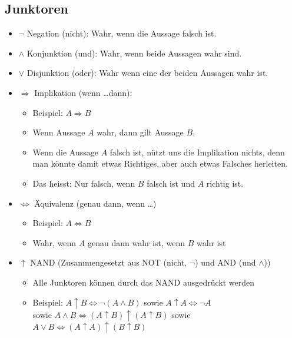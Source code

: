 \subsection{Junktoren}
\begin{itemize}
  \item $\neg$ Negation (nicht): Wahr, wenn die Aussage falsch ist.
  \item $\wedge$ Konjunktion (und): Wahr, wenn beide Aussagen wahr sind.
  \item $\vee$ Disjunktion (oder): Wahr wenn eine der beiden Aussagen wahr ist.
  \item $\Rightarrow$ Implikation (wenn \dots dann):
    \begin{itemize}
      \item Beispiel: $A \Rightarrow B$
      \item Wenn Aussage $A$ wahr, dann gilt Aussage $B$.
      \item Wenn die Aussage $A$ falsch ist, nützt uns die Implikation nichts,
        denn man könnte damit etwas Richtiges, aber auch etwas Falsches herleiten.
      \item Das heisst: Nur falsch, wenn $B$ falsch ist und $A$ richtig ist.
    \end{itemize}
  \item $\Leftrightarrow$ Äquivalenz (genau dann, wenn \dots)
    \begin{itemize}
      \item Beispiel: $A \Leftrightarrow B$
      \item Wahr, wenn $A$ genau dann wahr ist, wenn $B$ wahr ist
    \end{itemize}
  \item $\uparrow$ NAND (Zusammengesetzt aus NOT (nicht, $\neg$) und AND (und $\wedge$))
    \begin{itemize}
      \item Alle Junktoren können durch das NAND ausgedrückt werden
      \item Beispiel: $A \uparrow B \Leftrightarrow \neg (A \wedge B)$ sowie $A \uparrow A \Leftrightarrow \neg A$ \\
       sowie $A \wedge B \Leftrightarrow (A \uparrow B) \uparrow (A \uparrow B)$ sowie 
         $A \vee B \Leftrightarrow (A \uparrow A) \uparrow (B \uparrow B)$
    \end{itemize}
\end{itemize}

